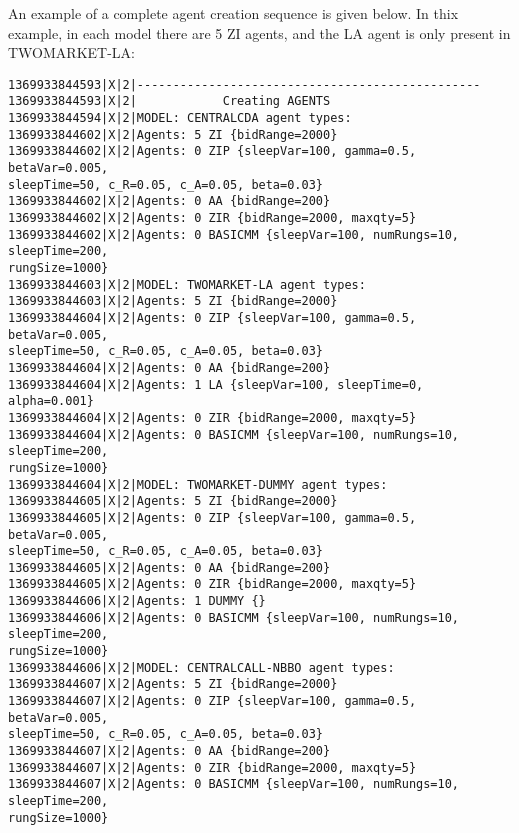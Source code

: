 \documentclass[11pt]{article}
\begin{document}
An example of a complete agent creation sequence is given below.
In thix example, in each model there are 5 ZI agents, and the LA agent is only present in TWOMARKET-LA:
\begin{verbatim}
1369933844593|X|2|------------------------------------------------
1369933844593|X|2|            Creating AGENTS
1369933844594|X|2|MODEL: CENTRALCDA agent types:
1369933844602|X|2|Agents: 5 ZI {bidRange=2000}
1369933844602|X|2|Agents: 0 ZIP {sleepVar=100, gamma=0.5, betaVar=0.005, 
sleepTime=50, c_R=0.05, c_A=0.05, beta=0.03}
1369933844602|X|2|Agents: 0 AA {bidRange=200}
1369933844602|X|2|Agents: 0 ZIR {bidRange=2000, maxqty=5}
1369933844602|X|2|Agents: 0 BASICMM {sleepVar=100, numRungs=10, sleepTime=200, 
rungSize=1000}
1369933844603|X|2|MODEL: TWOMARKET-LA agent types:
1369933844603|X|2|Agents: 5 ZI {bidRange=2000}
1369933844604|X|2|Agents: 0 ZIP {sleepVar=100, gamma=0.5, betaVar=0.005, 
sleepTime=50, c_R=0.05, c_A=0.05, beta=0.03}
1369933844604|X|2|Agents: 0 AA {bidRange=200}
1369933844604|X|2|Agents: 1 LA {sleepVar=100, sleepTime=0, alpha=0.001}
1369933844604|X|2|Agents: 0 ZIR {bidRange=2000, maxqty=5}
1369933844604|X|2|Agents: 0 BASICMM {sleepVar=100, numRungs=10, sleepTime=200, 
rungSize=1000}
1369933844604|X|2|MODEL: TWOMARKET-DUMMY agent types:
1369933844605|X|2|Agents: 5 ZI {bidRange=2000}
1369933844605|X|2|Agents: 0 ZIP {sleepVar=100, gamma=0.5, betaVar=0.005, 
sleepTime=50, c_R=0.05, c_A=0.05, beta=0.03}
1369933844605|X|2|Agents: 0 AA {bidRange=200}
1369933844605|X|2|Agents: 0 ZIR {bidRange=2000, maxqty=5}
1369933844606|X|2|Agents: 1 DUMMY {}
1369933844606|X|2|Agents: 0 BASICMM {sleepVar=100, numRungs=10, sleepTime=200, 
rungSize=1000}
1369933844606|X|2|MODEL: CENTRALCALL-NBBO agent types:
1369933844607|X|2|Agents: 5 ZI {bidRange=2000}
1369933844607|X|2|Agents: 0 ZIP {sleepVar=100, gamma=0.5, betaVar=0.005, 
sleepTime=50, c_R=0.05, c_A=0.05, beta=0.03}
1369933844607|X|2|Agents: 0 AA {bidRange=200}
1369933844607|X|2|Agents: 0 ZIR {bidRange=2000, maxqty=5}
1369933844607|X|2|Agents: 0 BASICMM {sleepVar=100, numRungs=10, sleepTime=200, 
rungSize=1000}
\end{verbatim}
\end{document}
